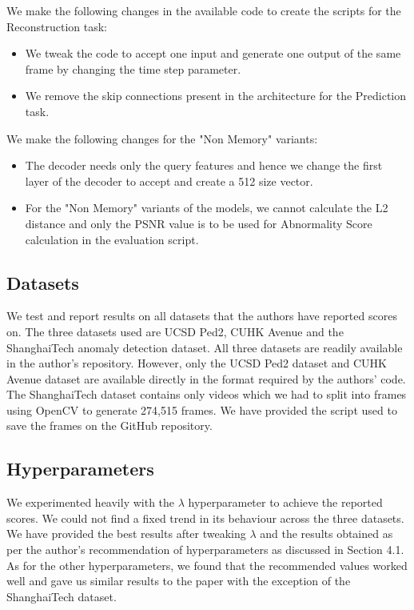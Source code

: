We make the following changes in the available code to create the scripts for the Reconstruction task: 
\begin{itemize}
    \item We tweak the code to accept one input and generate one output of the same frame by changing the time step parameter. 
    \item We remove the skip connections present in the architecture for the Prediction task.
\end{itemize}
We make the following changes for the "Non Memory" variants: 
\begin{itemize}
    \item The decoder needs only the query features and hence we change the first layer of the decoder to accept and create a 512 size vector.
    \item For the "Non Memory" variants of the models, we cannot calculate the L2 distance and only the PSNR value is to be used for Abnormality Score calculation in the evaluation script.
\end{itemize}


\subsection{Datasets}
We test and report results on all datasets that the authors have reported scores on. The three datasets used are UCSD Ped2\cite{6739466}, CUHK Avenue\cite{6751449} and the ShanghaiTech\cite{Luo2017ARO} anomaly detection dataset. All three datasets are readily available in the author’s repository. 
However, only the UCSD Ped2 dataset\cite{6739466} and CUHK Avenue dataset \cite{6751449} are available directly in the format required by the authors’ code. The ShanghaiTech dataset\cite{Luo2017ARO} contains only videos which we had to split into frames using OpenCV to generate 274,515 frames. We have provided the script used to save the frames on the GitHub repository.

\subsection{Hyperparameters}
We experimented heavily with the $\lambda$ hyperparameter to achieve the reported scores. We could not find a fixed trend in its behaviour across the three datasets. We have provided the best results after tweaking $\lambda$ and the results obtained as per the author’s recommendation of hyperparameters as discussed in Section 4.1. As for the other hyperparameters, we found that the recommended values worked well and gave us similar results to the paper with the exception of the ShanghaiTech dataset\cite{Luo2017ARO}. 


